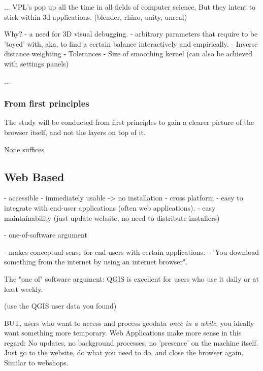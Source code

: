 ...
VPL's pop up all the time in all fields of computer science, But they intent to stick within 3d applications. (blender, rhino, unity, unreal)

Why? 
- a need for 3D visual debugging. 
- arbitrary parameters that require to be 'toyed' with, aka, to find a certain balance interactively and empirically.
  - Inverse distance weighting
  - Tolerances
  - Size of smoothing kernel
(can also be achieved with settings panels)

...


\subsubsection*{From first principles}

The study will be conducted from first principles to gain a clearer picture of the browser itself, 
and not the layers on top of it.


None suffices



\subsection{Web Based}

- accessible
    - immediately usable -> no installation
    - cross platform
    - easy to integrate with end-user applications (often web applications).
    - easy maintainability (just update website, no need to distribute installers)

- one-of-software argument

- makes conceptual sense for end-users with certain applications: 
  - "You download something from the internet by using an internet browser".

The "one of" software argument: QGIS is excellent for users who use it daily or at least weekly. 

(use the QGIS user data you found)

BUT, users who want to access and process geodata \emph{once in a while}, you ideally want something more temporary. Web Applications make more sense in this regard: No updates, no background processes, no 'presence' on the machine itself. Just go to the website, do what you need to do, and close the browser again. Similar to webshops.

